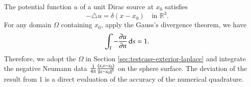 \documentclass[11pt, a4paper]{book}
\begin{document}
The potential function $u$ of a unit Dirac source at $x_0$ satisfies
\begin{equation}
  -\triangle u = \delta(x-x_0) \quad \text{in $\mathbb{R}^3$}.
\end{equation}
For any domain $\Omega$ containing $x_0$, apply the Gauss's divergence theorem, we have
\begin{equation}
  \int_{\Gamma} -\frac{\partial u}{\partial n} \,\mathrm{d} s = 1.
\end{equation}
Therefore, we adopt the $\Omega$ in Section \ref{sec:testcase-exterior-laplace} and
integrate the negative Neumann data $\frac{1}{4\pi}\frac{(x, x-x_0)}{\lVert x-x_0\rVert^3}$ on
the sphere surface. The deviation of the result from 1 is a direct evaluation of the
accuracy of the numerical quadrature.



\listofalgorithms

\lstlistoflistings
\end{document}
